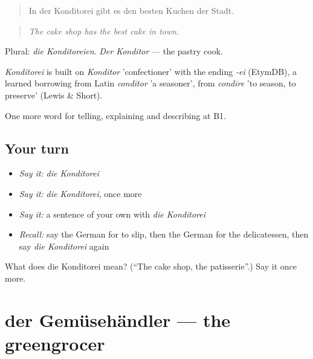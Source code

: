 \begin{quote}
In der Konditorei gibt es den besten Kuchen der Stadt.
\end{quote}

\begin{quote}
\emph{The cake shop has the best cake in town.}
\end{quote}

Plural: \emph{die Konditoreien}. \emph{Der Konditor} — the pastry cook.

\begin{cousinweb}
\emph{Konditorei} is built on \emph{Konditor} 'confectioner' with the ending \emph{-ei} (EtymDB), a learned borrowing from Latin \emph{condītor} 'a seasoner', from \emph{condīre} 'to season, to preserve' (Lewis \& Short).
\end{cousinweb}

\begin{grammarlens}[title={What you've built}]
One more word for telling, explaining and describing at B1.
\end{grammarlens}

\subsection*{Your turn}
\begin{itemize}
\raggedright
  \item \emph{Say it:} \emph{die Konditorei}
  \item \emph{Say it:} \emph{die Konditorei}, once more
  \item \emph{Say it:} a sentence of your own with \emph{die Konditorei}
  \item \emph{Recall:} say the German for to slip, then the German for the delicatessen, then say \emph{die Konditorei} again
\end{itemize}

\begin{tcolorbox}[breakable,colback=teal!4,colframe=teal!35!black,title={Before you move on}]
What does die Konditorei mean? (\textquotedblleft{}The cake shop, the patisserie\textquotedblright{}.) Say it once more.
\end{tcolorbox}
\section[der Gemüsehändler]{der Gemüsehändler — the greengrocer}

\label{lesson:GE-C443-gemuesehaendler}



